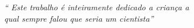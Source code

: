 \begin{epigrafe}
	\vspace*{\fill}
	\begin{flushright}
		\textit{``
		Este trabalho é inteiramente dedicado a criança a 
		\\ qual sempre falou que seria um cientista''}
	\end{flushright}
\end{epigrafe}
